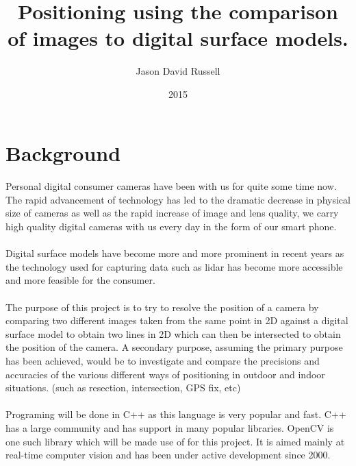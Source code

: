 \documentclass{article}
\title{Positioning using the comparison of images to digital surface models.}
\date{2015}
\author{Jason David Russell}
\begin{document}
\maketitle
{}

\newpage
\tableofcontents

\newpage
{}

\section{Background}
\paragraph{}
Personal digital consumer cameras have been with us for quite some time now. The rapid advancement of technology has led to the dramatic decrease in physical size of cameras as well as the rapid increase of image and lens quality, we carry high quality digital cameras with us every day in the form of our smart phone.

\paragraph{}
Digital surface models have become more and more prominent in recent years as the technology used for capturing data such as lidar has become more accessible and more feasible for the consumer. 

\paragraph{}
The purpose of this project is to try to resolve the position of a camera by comparing two different images taken from the same point in 2D against a digital surface model to obtain two lines in 2D which can then be intersected to obtain the position of the camera. A secondary purpose, assuming the primary purpose has been achieved, would be to investigate and compare the precisions and accuracies of the various different ways of positioning in outdoor and indoor situations. (such as resection, intersection, GPS fix, etc)

\paragraph{}
Programing will be done in C++ as this language is very popular and fast. C++ has a large community and has support in many popular libraries. OpenCV is one such library which will be made use of for this project. It is aimed mainly at real-time computer vision and has been under active development since 2000. 
\end{document}
